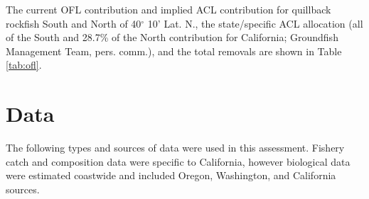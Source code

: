 \documentclass[11pt,
  english,
  a4paper,
]{article}
\begin{document}
\leavevmode\tagmcend\tagstructend\par


The current OFL contribution and implied ACL contribution for quillback rockfish South and North of 40{\(^\circ\)\leavevmode\tagmcend\tagstructend} 10' Lat. N., the state/specific ACL allocation (all of the South and 28.7\% of the North contribution for California; Groundfish Management Team, pers. comm.), and the total removals are shown in Table \ref{tab:ofl}.

\leavevmode\tagmcend\tagstructend\par


\hypertarget{data}{%
\section{Data}\label{data}}

\leavevmode\tagmcend\tagstructend


The following types and sources of data were used in this assessment. Fishery catch and composition data were specific to California, however biological data were estimated coastwide and included Oregon, Washington, and California sources.

\leavevmode\tagmcend\tagstructend\par

\end{document}
